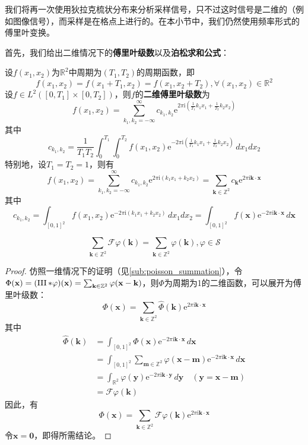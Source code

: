 我们将再一次使用狄拉克梳状分布来分析采样信号，只不过这时信号是二维的（例如图像信号），而采样是在格点上进行的。在本小节中，我们仍然使用频率形式的傅里叶变换。

首先，我们给出二维情况下的\textbf{傅里叶级数}以及\textbf{泊松求和公式}：
\begin{definition}[二维傅里叶级数]
    设$f(x_1,x_2)$为$\mathbb{R}^2$中周期为$(T_1,T_2)$的周期函数，即
    \[f(x_1,x_2)=f(x_1+T_1,x_2)=f(x_1,x_2+T_2),\forall (x_1,x_2)\in\mathbb{R}^2\]
    设$f\in L^2([0,T_1]\times[0,T_2])$，则$f$的\textbf{二维傅里叶级数}为
    \[f(x_1,x_2)=\sum_{k_1,k_2=-\infty}^{\infty}c_{k_1,k_2}\mathrm{e}^{2\pi \mathrm{i}\left(\frac{1}{T_1}k_1 x_1+\frac{1}{T_2}k_2 x_2\right)}\]
    其中
    \[c_{k_1,k_2}=\frac{1}{T_1 T_2}\int_0^{T_1}\int_0^{T_2}f(x_1,x_2)\mathrm{e}^{-2\pi \mathrm{i}\left(\frac{1}{T_1}k_1 x_1+\frac{1}{T_2}k_2 x_2\right)}\,dx_1 dx_2\]
    特别地，设$T_1=T_2=1$，则有
    \[f(x_1,x_2)=\sum_{k_1,k_2=-\infty}^{\infty}c_{k_1,k_2}\mathrm{e}^{2\pi \mathrm{i}(k_1 x_1+k_2 x_2)}=\sum_{\mathbf{k}\in\mathbb{Z}^2}c_{\mathbf{k}}\mathrm{e}^{2\pi \mathrm{i}\mathbf{k\cdot x}}\]
    其中
    \[c_{k_1,k_2}=\int_{[0,1]^2}f(x_1,x_2)\mathrm{e}^{-2\pi \mathrm{i}(k_1 x_1+k_2 x_2)}\,dx_1 dx_2=\int_{[0,1]^2}f(\mathbf{x})\mathrm{e}^{-2\pi \mathrm{i} \mathbf{k}\cdot \mathbf{x}}\,d\mathbf{x}\]
\end{definition}
\begin{theorem}[二维泊松求和公式]
    \[\sum_{\mathbf{k}\in\mathbb{Z}^2}\mathcal{F} \varphi(\mathbf{k})=\sum_{\mathbf{k}\in\mathbb{Z}^2}\varphi(\mathbf{k}),\varphi\in\mathcal{S} \]
\end{theorem}
\begin{proof}
    仿照一维情况下的证明（见\ref{sub:poisson_summation}），令$\Phi(\mathbf{x})=(\operatorname{III} *\varphi)(\mathbf{x})=\sum_{\mathbf{k}\in\mathbb{Z}^2}\varphi(\mathbf{x}-\mathbf{k})$，则$\Phi$为周期为1的二维函数，可以展开为傅里叶级数：
    \[\Phi(\mathbf{x})=\sum_{\mathbf{k}\in\mathbb{Z}^2}\hat{\Phi}(\mathbf{k})\mathrm{e}^{2\pi \mathrm{i} \mathbf{k}\cdot \mathbf{x}}\]
    其中\begin{align*}
        \hat{\Phi}(\mathbf{k})&=\int_{[0,1]^2}\Phi(\mathbf{x})\mathrm{e}^{-2\pi \mathrm{i}\mathbf{k}\cdot \mathbf{x}}\,d\mathbf{x}\\
        &=\int_{[0,1]^2}\sum_{\mathbf{m}\in\mathbb{Z}^2}\varphi(\mathbf{x}-\mathbf{m})\mathrm{e}^{-2\pi \mathrm{i}\mathbf{k}\cdot \mathbf{x}}\,d\mathbf{x}\\
        &=\int_{\mathbb{R}^2}\varphi(\mathbf{y})\mathrm{e}^{-2\pi \mathrm{i}\mathbf{k}\cdot \mathbf{y}}\,d\mathbf{y}\quad (\mathbf{y}=\mathbf{x}-\mathbf{m})\\
        &=\mathcal{F} \varphi(\mathbf{k})
    \end{align*}
    因此，有
    \[\Phi(\mathbf{x})=\sum_{\mathbf{k}\in\mathbb{Z}^2}\mathcal{F} \varphi(\mathbf{k})\mathrm{e}^{2\pi \mathrm{i} \mathbf{k}\cdot \mathbf{x}}\]
    令$\mathbf{x}=\mathbf{0}$，即得所需结论。
\end{proof}

